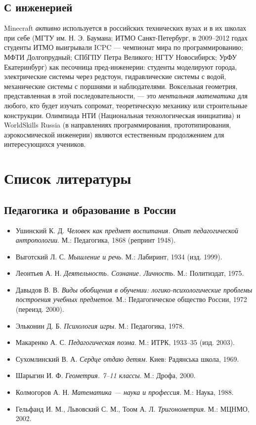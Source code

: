 \documentclass[12pt,a4paper]{scrartcl}
\begin{document}
\subsection{С инженерией}
Minecraft \emph{активно} используется в российских технических вузах и в их школах при себе (МГТУ им. Н. Э. Баумана; ИТМО Санкт-Петербург, в 2009--2012 годах студенты ИТМО выигрывали ICPC --- чемпионат мира по программированию; МФТИ Долгопрудный; СПбГПУ Петра Великого; НГТУ Новосибирск; УрФУ Екатеринбург) как песочница пред-инженерии: студенты моделируют города, электрические системы через редстоун, гидравлические системы с водой, механические системы с поршнями и наблюдателями. Воксельная геометрия, представленная в этой последовательности, --- это \emph{ментальная математика} для любого, кто будет изучать сопромат, теоретическую механику или строительные конструкции. Олимпиада НТИ (Национальная технологическая инициатива) и WorldSkills Russia (в направлениях программирования, прототипирования, аэрокосмической инженерии) являются естественным продолжением для интересующихся учеников.

\section{Список литературы}\label{sec:referencias}

\subsection{Педагогика и образование в России}
\begin{itemize}[leftmargin=1.3em,itemsep=0.15em,topsep=0.3em]
  \item Ушинский К. Д. \emph{Человек как предмет воспитания. Опыт педагогической антропологии}. М.: Педагогика, 1868 (репринт 1948).
  \item Выготский Л. С. \emph{Мышление и речь}. М.: Лабиринт, 1934 (изд. 1999).
  \item Леонтьев А. Н. \emph{Деятельность. Сознание. Личность}. М.: Политиздат, 1975.
  \item Давыдов В. В. \emph{Виды обобщения в обучении: логико-психологические проблемы построения учебных предметов}. М.: Педагогическое общество России, 1972 (переизд. 2000).
  \item Эльконин Д. Б. \emph{Психология игры}. М.: Педагогика, 1978.
  \item Макаренко А. С. \emph{Педагогическая поэма}. М.: ИТРК, 1933--35 (изд. 2003).
  \item Сухомлинский В. А. \emph{Сердце отдаю детям}. Киев: Радянська школа, 1969.
  \item Шарыгин И. Ф. \emph{Геометрия. 7--11 классы}. М.: Дрофа, 2000.
  \item Колмогоров А. Н. \emph{Математика --- наука и профессия}. М.: Наука, 1988.
  \item Гельфанд И. М., Львовский С. М., Тоом А. Л. \emph{Тригонометрия}. М.: МЦНМО, 2002.
\end{itemize}
\end{document}
